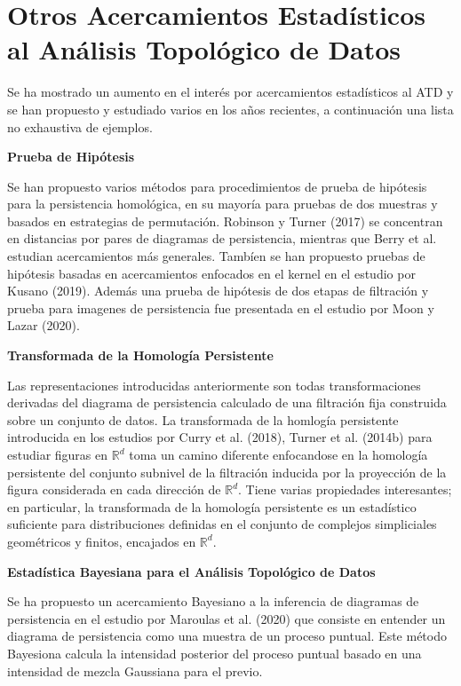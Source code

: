 \section{Otros Acercamientos Estad\'isticos al An\'alisis Topol\'ogico de Datos}

Se ha mostrado un aumento en el inter\'es por acercamientos estad\'isticos al ATD
y se han propuesto y estudiado varios en los a\~{n}os recientes, a continuaci\'on
una lista no exhaustiva de ejemplos.

\textbf{\large Prueba de Hip\'otesis}

Se han propuesto varios m\'etodos para procedimientos de prueba de hip\'otesis
para la persistencia homol\'ogica, en su mayor\'ia para pruebas de dos muestras y
basados en estrategias de permutaci\'on.
Robinson y Turner (2017)\cite{Robinson2017} se concentran en distancias por pares
de diagramas de persistencia, mientras que Berry et al. \cite{Berry2020}
estudian acercamientos m\'as generales.
Tamb\'ien se han propuesto pruebas de hip\'otesis basadas en
acercamientos enfocados en el kernel en el estudio por Kusano (2019)\cite{Kusano2019}.
Adem\'as una prueba de hip\'otesis de dos etapas de filtraci\'on y prueba para imagenes de
persistencia fue presentada en el estudio por
Moon y Lazar (2020)\cite{Moon2020}.\medbreak\medbreak

\textbf{\large Transformada de la Homolog\'ia Persistente}

Las representaciones introducidas anteriormente son todas transformaciones derivadas
del diagrama de persistencia calculado de una filtraci\'on fija construida sobre
un conjunto de datos.
La transformada de la homlog\'ia persistente introducida en los estudios por
Curry et al. (2018)\cite{Curry2018}, Turner et al. (2014b)\cite{Turner2014b}
para estudiar figuras en $\mathbb{R}^{d}$
toma un camino diferente enfocandose en la homolog\'ia persistente del
conjunto subnivel de la filtraci\'on inducida por la proyecci\'on de la figura
considerada en cada direcci\'on de $\mathbb{R}^{d}$.
Tiene varias propiedades interesantes; en particular, la transformada de la
homolog\'ia persistente es un estad\'istico suficiente para distribuciones definidas en
el conjunto de complejos simpliciales geom\'etricos y finitos,
encajados en $\mathbb{R}^{d}$. \medbreak\medbreak

\textbf{\large Estad\'istica Bayesiana para el An\'alisis Topol\'ogico de Datos}

Se ha propuesto un acercamiento Bayesiano a la inferencia de diagramas de persistencia
en el estudio por Maroulas et al. (2020)\cite{Maroulas2020}
que consiste en entender un diagrama de persistencia como una muestra de un proceso puntual.
Este m\'etodo Bayesiona calcula la intensidad posterior del proceso puntual basado en
una intensidad de mezcla Gaussiana para el previo.

